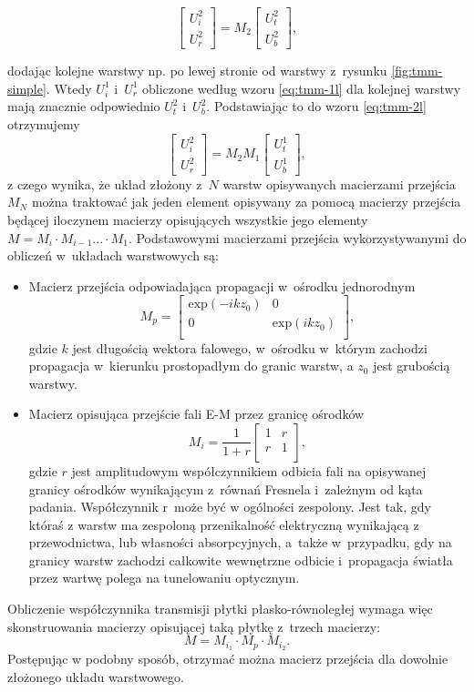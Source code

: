 \begin{equation}
	\begin{bmatrix}
	U_i^2 \\ 
	U_r^2
	\end{bmatrix}
	= M_2 
	\begin{bmatrix}
	U_t^2 \\
	U_b^2
	\end{bmatrix},
\label{eq:tmm-2l}
\end{equation}

dodając kolejne warstwy np. po lewej stronie od warstwy z~rysunku \ref{fig:tmm-simple}. Wtedy $U_i^1$ i~$U_r^1$ obliczone według wzoru \ref{eq:tmm-1l} dla kolejnej warstwy mają znacznie odpowiednio $U_t^2$ i~$U_b^2$. Podstawiając to do wzoru \ref{eq:tmm-2l} otrzymujemy 
\begin{equation}
\begin{bmatrix}
U_i^2 \\ 
U_r^2
\end{bmatrix}
=M_2 M_1 
\begin{bmatrix}
U_t^1 \\
U_b^1
\end{bmatrix},
\label{eq:tmm-2ls}
\end{equation}
z czego wynika, że układ złożony z~$N$ warstw opisywanych macierzami przejścia $M_N$ można traktować jak jeden element opisywany za pomocą macierzy przejścia będącej iloczynem macierzy opisujących wszystkie jego elementy $M= M_i \cdot M_{i-1} ... \cdot M_1$. Podstawowymi macierzami przejścia wykorzystywanymi do obliczeń w~układach warstwowych są:
\begin{itemize}
\item Macierz przejścia odpowiadająca propagacji w~ośrodku jednorodnym 
\begin{equation}
	M_p=
	\begin{bmatrix}
	\textrm{exp}(-i k z_0) & 0 \\
	0	&\textrm{exp}(i k z_0)\\
	\end{bmatrix},
\end{equation}
gdzie $k$ jest długością wektora falowego, w~ośrodku w~którym zachodzi propagacja w~kierunku prostopadłym do granic warstw, a $z_0$ jest grubością warstwy.
\item Macierz opisująca przejście fali E-M przez granicę ośrodków
\begin{equation}
	M_i=\frac{1}{1+r}
	\begin{bmatrix}
	1 &  r \\
	 r & 1\\
	\end{bmatrix},
\end{equation}
gdzie $r$ jest amplitudowym współczynnikiem odbicia fali na opisywanej granicy ośrodków wynikającym z~równań Fresnela i~zależnym od kąta padania. Współczynnik r~może być w ogólności zespolony. Jest tak, gdy któraś z warstw ma zespoloną przenikalność elektryczną wynikającą z przewodnictwa, lub własności absorpcyjnych, a~także w~przypadku, gdy na granicy warstw zachodzi całkowite wewnętrzne odbicie i~propagacja światła przez wartwę polega na tunelowaniu optycznym.
\end{itemize}

Obliczenie współczynnika transmisji płytki płasko-równoległej wymaga więc skonstruowania macierzy opisującej taką płytkę z~trzech macierzy: 
\[
M=M_{i_1} \cdot M_p \cdot  M_{i_2}.
\]
Postępując w podobny sposób, otrzymać można macierz przejścia dla dowolnie złożonego układu warstwowego. 
